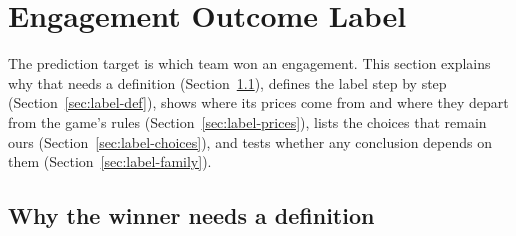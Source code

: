 
\section{Engagement Outcome Label}\label{sec:label}

The prediction target is which team won an engagement. This section explains why that needs a
definition (Section~\ref{sec:label-why}), defines the label step by step
(Section~\ref{sec:label-def}), shows where its prices come from and where they depart from the game's
rules (Section~\ref{sec:label-prices}), lists the choices that remain ours
(Section~\ref{sec:label-choices}), and tests whether any conclusion depends on them
(Section~\ref{sec:label-family}).

\subsection{Why the winner needs a definition}\label{sec:label-why}

